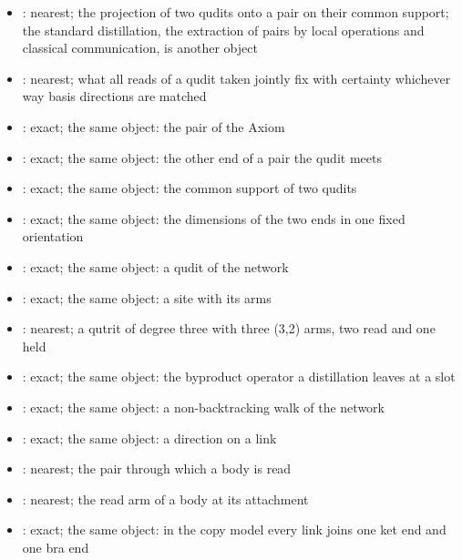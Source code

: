 \begin{chtheorem}
\begin{itemize}
\item {}: nearest; the projection of two qudits onto a pair on their common support; the standard distillation, the extraction of pairs by local operations and classical communication, is another object
\item {}: nearest; what all reads of a qudit taken jointly fix with certainty whichever way basis directions are matched
\item {}: exact; the same object: the pair of the Axiom
\item {}: exact; the same object: the other end of a pair the qudit meets
\item {}: exact; the same object: the common support of two qudits
\item {}: exact; the same object: the dimensions of the two ends in one fixed orientation
\item {}: exact; the same object: a qudit of the network
\item {}: exact; the same object: a site with its arms
\item {}: nearest; a qutrit of degree three with three (3,2) arms, two read and one held
\item {}: exact; the same object: the byproduct operator a distillation leaves at a slot
\item {}: exact; the same object: a non-backtracking walk of the network
\item {}: exact; the same object: a direction on a link
\item {}: nearest; the pair through which a body is read
\item {}: nearest; the read arm of a body at its attachment
\item {}: exact; the same object: in the copy model every link joins one ket end and one bra end

\end{itemize}
\end{chtheorem}
